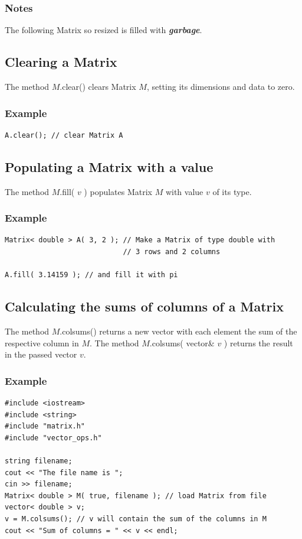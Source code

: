 \documentclass{report}
\begin{document}
\subsubsection{Notes}
The following Matrix so resized is filled with {\em \bf garbage}.

\subsection{Clearing a Matrix}

The method $M$.clear() clears Matrix $M$, setting its dimensions and
data to zero.

\subsubsection{Example}
\begin{verbatim}
A.clear(); // clear Matrix A
\end{verbatim}

\subsection{Populating a Matrix with a value}

The method $M$.fill( $v$ ) populates Matrix $M$ with value $v$ of its
type.

\subsubsection{Example}
\begin{verbatim}
Matrix< double > A( 3, 2 ); // Make a Matrix of type double with
                            // 3 rows and 2 columns

A.fill( 3.14159 ); // and fill it with pi
\end{verbatim}

\subsection{Calculating the sums of columns of a Matrix}

The method $M$.colsums() returns a new vector with each element the
sum of the respective column in $M$.  The method $M$.colsums( vector\&
$v$ ) returns the result in the passed vector $v$.

\subsubsection{Example}
\begin{verbatim}
#include <iostream>
#include <string>
#include "matrix.h"
#include "vector_ops.h"

string filename;
cout << "The file name is ";
cin >> filename;
Matrix< double > M( true, filename ); // load Matrix from file
vector< double > v;
v = M.colsums(); // v will contain the sum of the columns in M
cout << "Sum of columns = " << v << endl;
\end{verbatim}
\end{document}
